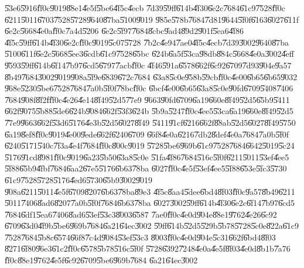 \documentclass[12pt,a4paper]{article}
\begin{document}
\U{53e6}\U{5916}\U{ff0c}\U{9019}\U{88e1}\U{4e5f}\U{5be6}\U{4f5c}\U{4ecb}%
\U{7d39}\U{59ff}\U{614b}\U{4f30}\U{6e2c}\U{7684}\U{61c9}\U{7528}\U{ff0c}%
\U{6211}\U{5011}\U{6703}\U{7528}\U{5728}\U{9640}\U{87ba}\U{5100}\U{9019}%
\U{985e}\U{578b}\U{7684}\U{7d81}\U{9644}\U{5f0f}\U{6163}\U{6027}\U{611f}%
\U{6e2c}\U{5668}\cite[Ch 3.6.4]{titterton}\U{4e0a}\U{ff0c}\U{7a4d}\U{5206}%
\U{6e2c}\U{5f97}\U{7684}\U{8cbc}\U{9ad4}\U{89d2}\U{901f}\U{5ea6}\U{4f86}%
\U{4f5c}\U{59ff}\U{614b}\U{4f30}\U{6e2c}\U{ff0c}\U{9019}\U{5c07}\U{5728}%
\U{7b2c}\U{4e94}\U{7ae0}\U{4f5c}\U{4ecb}\U{7d39}\U{3002}\U{9640}\U{87ba}%
\U{5100}\U{611f}\U{6e2c}\U{5668}\U{5ee3}\U{6cdb}\U{61c9}\U{7528}\U{65bc}%
\U{624b}\U{6a5f}\U{53ca}\U{98db}\U{884c}\U{5668}\U{4e0a}\U{3002}\U{4eff}%
\U{9593}\U{59ff}\U{614b}\U{6f14}\U{7b97}\U{6cd5}\U{6797}\U{7acb}\U{ff0c}%
\U{4f46}\U{591a}\U{6578}\U{662f}\U{6c92}\U{6709}\U{7d93}\U{904e}\U{9a57}%
\U{8b49}\U{7684}\U{3002}\U{9019}\U{908a}\U{5f9e}\U{6839}\U{672c}\U{7684}%
\U{63a8}\U{5c0e}\U{958b}\U{59cb}\U{ff0c}\U{4e00}\U{6b65}\U{6b65}\U{9032}%
\U{968e}\U{5230}\U{5be6}\U{7528}\U{7684}\U{7a0b}\U{5f0f}\U{78bc}\U{ff0c}%
\U{6bcf}\U{4e00}\U{6b65}\U{63a8}\U{5c0e}\U{90fd}\U{6709}\U{5408}\U{7406}%
\U{7684}\U{908f}\U{8f2f}\U{ff0c}\U{4e26}\U{4e14}\U{8f49}\U{52d5}\U{77e9}%
\U{9663}\U{90fd}\U{6709}\U{6a19}\U{660e}\U{8f49}\U{52d5}\U{65b9}\U{5411}%
\U{662f}\U{9075}\U{5b88}\U{5de6}\U{624b}\U{9084}\U{662f}\U{53f3}\U{624b}%
\U{5b9a}\U{5247}\U{ff0c}\U{4ee5}\U{53ca}\U{6a19}\U{660e}\U{8f49}\U{52d5}%
\U{77e9}\U{9663}\U{662f}\U{53d6}\U{5176}\U{4e3b}\U{52d5}\U{6027}\U{8f49}%
\U{5411}\U{91cf}\U{6216}\U{662f}\U{88ab}\U{52d5}\U{6027}\U{8f49}\U{5750}%
\U{6a19}\U{8ef8}\U{ff0c}\U{9019}\U{4e00}\U{9ede}\U{662f}\U{6240}\U{6709}%
\U{66f8}\U{4e0a}\U{6216}\U{7db2}\U{8def}\U{4e0a}\U{7684}\U{7a0b}\U{5f0f}%
\U{6240}\U{5171}\U{540c}\U{7f3a}\U{4e4f}\U{7684}\U{ff0c}\U{800c}\U{9019}%
\U{5728}\U{5be6}\U{969b}\U{61c9}\U{7528}\U{7684}\U{6642}\U{5019}\U{5c24}%
\U{5176}\U{91cd}\U{8981}\U{ff0c}\U{9019}\U{6a23}\U{5b50}\U{63a8}\U{5c0e}%
\U{51fa}\U{4f86}\U{7684}\U{516c}\U{5f0f}\U{6211}\U{5011}\U{53ef}\U{4ee5}%
\U{5f88}\U{65b9}\U{4fbf}\U{7684}\U{6aa2}\U{67e5}\U{5176}\U{6b63}\U{78ba}%
\U{6027}\U{ff0c}\U{4e5f}\U{53ef}\U{4ee5}\U{5f88}\U{653e}\U{5fc3}\U{5730}%
\U{61c9}\U{7528}\U{5728}\U{5176}\U{4ed6}\U{5730}\U{65b9}\U{3002}\U{9019}%
\U{908a}\U{6211}\U{5011}\U{4e5f}\U{6709}\U{8207}\U{6b63}\U{78ba}\U{89e3}%
\U{4f5c}\U{8aa4}\U{5dee}\U{6bd4}\U{8f03}\U{ff0c}\U{9a57}\U{8b49}\U{6211}%
\U{5011}\U{7406}\U{8ad6}\U{8207}\U{7a0b}\U{5f0f}\U{7684}\U{6b63}\U{78ba}%
\U{6027}\U{3002}\U{59ff}\U{614b}\U{4f30}\U{6e2c}\U{6f14}\U{7b97}\U{6cd5}%
\U{7684}\U{6df1}\U{5ea6}\U{7406}\U{8ad6}\U{53ef}\U{53c3}\U{8003}\U{6587}%
\U{7ae0}\cite{savage}\U{ff0c}\U{4e0d}\U{904e}\U{88e1}\U{9762}\U{4e26}\U{6c92}%
\U{6709}\U{63d0}\U{4f9b}\U{5be6}\U{969b}\U{7684}\U{6a21}\U{64ec}\U{3002}%
\U{59ff}\U{614b}\U{52d5}\U{529b}\U{5b78}\U{5728}\U{5c0e}\U{822a}\U{61c9}%
\U{7528}\U{7684}\U{5b8c}\U{6574}\U{66f8}\U{7c4d}\U{9084}\U{53ef}\U{53c3}%
\U{8003}\cite{bekir}\U{ff0c}\U{4e0d}\U{904e}\U{5c31}\U{662f}\U{6bd4}\U{8f03}%
\U{8271}\U{6f80}\U{96e3}\U{61c2}\U{ff0c}\U{6578}\U{5b78}\U{516c}\U{5f0f}%
\U{5728}\U{6392}\U{7248}\U{4e0a}\U{4e5f}\U{8f03}\U{4e0d}\U{8b1b}\U{7a76}%
\U{ff0c}\U{88e1}\U{9762}\U{4e5f}\U{6c92}\U{6709}\U{5be6}\U{969b}\U{7684}%
\U{6a21}\U{64ec}\U{3002}
\end{document}
